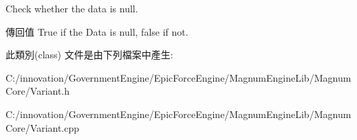 Check whether the data is null. 

\begin{DoxyReturn}{傳回值}
True if the Data is null, false if not. 
\end{DoxyReturn}


此類別(class) 文件是由下列檔案中產生\+:\begin{DoxyCompactItemize}
\item 
C\+:/innovation/\+Government\+Engine/\+Epic\+Force\+Engine/\+Magnum\+Engine\+Lib/\+Magnum\+Core/Variant.\+h\item 
C\+:/innovation/\+Government\+Engine/\+Epic\+Force\+Engine/\+Magnum\+Engine\+Lib/\+Magnum\+Core/Variant.\+cpp\end{DoxyCompactItemize}

